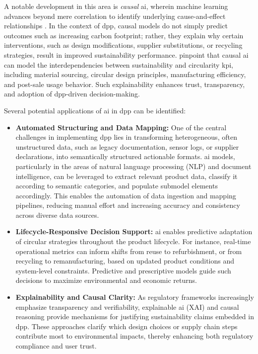 A notable development in this area is \textit{causal} \ac{ai}, wherein machine learning advances beyond mere correlation to identify underlying cause-and-effect relationships \autocite{Pearl.2018}. In the context of \ac{dpp}, causal models do not simply predict outcomes such as increasing carbon footprint; rather, they explain why certain interventions, such as design modifications, supplier substitutions, or recycling strategies, result in improved sustainability performance. \textcite{Ompusunggu.2024} pinpoint that causal \ac{ai} can model the interdependencies between sustainability and circularity \ac{kpi}, including material sourcing, circular design principles, manufacturing efficiency, and post-sale usage behavior. Such explainability enhances trust, transparency, and adoption of \ac{dpp}-driven decision-making.

Several potential applications of \ac{ai} in \ac{dpp} can be identified:
\begin{itemize}[itemsep=0.5\baselineskip]
    \item \textbf{Automated Structuring and Data Mapping:} One of the central challenges in implementing \ac{dpp} lies in transforming heterogeneous, often unstructured data, such as legacy documentation, sensor logs, or supplier declarations, into semantically structured actionable formats. \ac{ai} models, particularly in the areas of natural language processing (NLP) and document intelligence, can be leveraged to extract relevant product data, classify it according to semantic categories, and populate submodel elements accordingly. This enables the automation of data ingestion and mapping pipelines, reducing manual effort and increasing accuracy and consistency across diverse data sources. \autocite{Rajbabu.2018}

    \item \textbf{Lifecycle-Responsive Decision Support:} \ac{ai} enables predictive adaptation of circular strategies throughout the product lifecycle. For instance, real-time operational metrics can inform shifts from reuse to refurbishment, or from recycling to remanufacturing, based on updated product conditions and system-level constraints. Predictive and prescriptive models guide such decisions to maximize environmental and economic returns. \autocite{Kritzinger.2018, Tao.2018}

     \item \textbf{Explainability and Causal Clarity:} As regulatory frameworks increasingly emphasize transparency and verifiability, explainable \ac{ai} (XAI) and causal reasoning provide mechanisms for justifying sustainability claims embedded in \ac{dpp}. These approaches clarify which design choices or supply chain steps contribute most to environmental impacts, thereby enhancing both regulatory compliance and user trust. \autocite{Ompusunggu.2024}
\end{itemize}

